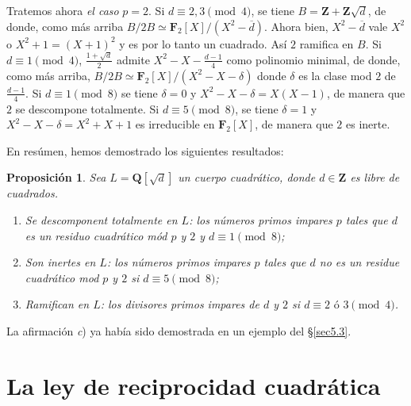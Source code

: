 \documentclass[oneside,bibtotoc,leqno,spanish]{amsbook}
\newcommand{\QQ}{\mathbf{Q}}
\newcommand{\ZZ}{\mathbf{Z}}
\newcommand{\FF}{\mathbf{F}}
\newcommand{\oline}[1]{\overline{#1}}
\numberwithin{equation}{section}
\theoremstyle{defi}
\theoremstyle{note}
\newtheorem{proposition}{Proposici\'on}
\theoremstyle{rem}
\numberwithin{theorem}{section}
\numberwithin{proposition}{section}
\numberwithin{definition}{section}
\numberwithin{lemma}{section}
\numberwithin{corollary}{section}
\numberwithin{example}{section}
\numberwithin{footnote}{section}%
\begin{document}
Tratemos ahora {\em el caso} $p=2$. Si $d\equiv 2, 3\pmod 4$, se tiene $B=\ZZ+\ZZ\sqrt{d}$, de donde,
como m\'as arriba $B/2B\simeq\FF_{2}[X]/(X^{2}-\oline d)$. Ahora bien, $X^{2}-\oline d$ vale $X^{2}$
o $X^{2}+1 = (X+1)^{2}$ y es por lo tanto un cuadrado. As\'i $2$ ramifica en $B$. Si $d\equiv 1\pmod 4$,
$\frac{1+\sqrt{d}}{2}$ admite $X^{2}-X-\frac{d-1}{4}$ como polinomio minimal, de donde, como m\'as arriba,
$B/2B\simeq\FF_{2}[X]/(X^{2}-X-\delta)$ donde $\delta$ es la clase mod $2$ de $\frac{d-1}{4}$. Si
$d\equiv 1\pmod 8$ se tiene $\delta=0$ y $X^{2}-X-\delta=X(X-1)$, de manera que $2$ se descompone
totalmente. Si $d\equiv 5\pmod 8$, se tiene $\delta=1$ y $X^{2}-X-\delta=X^{2}+X+1$ es irreducible en
$\FF_{2}[X]$, de manera que $2$ es inerte.

En res\'umen, hemos demostrado los siguientes resultados:

\begin{proposition}\label{prop5.4.1}
Sea $L = \QQ[\sqrt{d}]$ un cuerpo cuadr\'atico, donde $d\in\ZZ$ es libre de cuadrados.
\begin{enumerate}
\item Se descomponent totalmente en $L$: los n\'umeros primos impares $p$ tales que
$d$ es un residuo cuadr\'atico m\'od $p$ y $2$ y $d\equiv 1\pmod 8$;
\item Son inertes en $L${\upshape:} los n\'umeros primos impares $p$ tales que $d$ no es un
residue cuadr\'atico mod $p$ y $2$ si $d\equiv 5\pmod 8$;
\item Ramifican en $L$: los divisores primos impares de $d$ y $2$ si $d\equiv 2\text{ \'o }3\pmod 4$.
\end{enumerate}
\end{proposition}

La afirmaci\'on {\itshape c}) ya hab\'ia sido demostrada en un ejemplo del \S\ref{sec5.3}.

\section{La ley de reciprocidad cuadr\'atica}\label{sec5.5}
\end{document}
